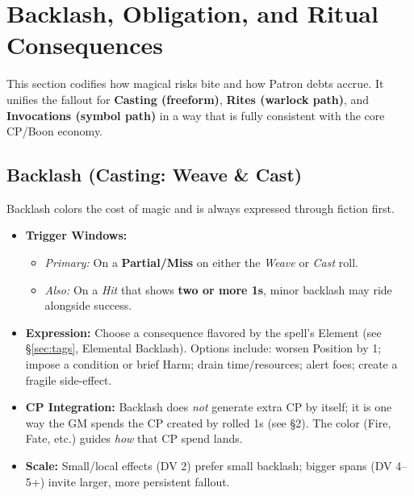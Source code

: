 

\section{Backlash, Obligation, and Ritual Consequences}
\label{sec:backlash-obligation}

This section codifies how magical risks bite and how Patron debts accrue. It unifies the fallout for \textbf{Casting (freeform)}, \textbf{Rites (warlock path)}, and \textbf{Invocations (symbol path)} in a way that is fully consistent with the core CP/Boon economy.

\subsection{Backlash (Casting: Weave \& Cast)}
Backlash colors the cost of magic and is always expressed through fiction first.
\begin{itemize}
  \item \textbf{Trigger Windows:}
    \begin{itemize}
      \item \emph{Primary:} On a \textbf{Partial/Miss} on either the \emph{Weave} or \emph{Cast} roll.
      \item \emph{Also:} On a \emph{Hit} that shows \textbf{two or more 1s}, minor backlash may ride alongside success.
    \end{itemize}
  \item \textbf{Expression:} Choose a consequence flavored by the spell's Element (see \S\ref{sec:tags}, Elemental Backlash). Options include: worsen Position by 1; impose a condition or brief Harm; drain time/resources; alert foes; create a fragile side-effect.
  \item \textbf{CP Integration:} Backlash does \emph{not} generate extra CP by itself; it is one way the GM spends the CP created by rolled 1s (see \S2). The color (Fire, Fate, etc.) guides \emph{how} that CP spend lands.
  \item \textbf{Scale:} Small/local effects (DV 2) prefer small backlash; bigger spans (DV 4--5+) invite larger, more persistent fallout.
\end{itemize}

